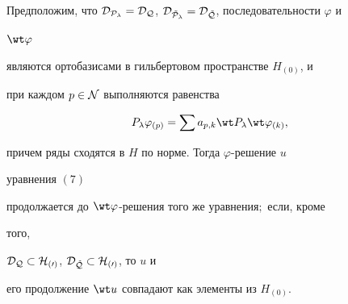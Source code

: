 \begin{thms} 


Предположим, что $\cal D_{P_\lambda}=\cal D_Q$, $\cal D_{\Tilde 


P_\lambda}=\cal D_{\Tilde Q}$, последовательности $\varphi$ и 


$\wt\varphi$ 


являются ортобазисами в гильбертовом пространстве $H_{(0)}$, и  


при каждом $p\in\cal N$ выполняются равенства 


\begin{equation} 


P_\lambda\varphi_{(p)}=\sum a_{p,k}\wt P_\lambda\wt\varphi_{(k)}, 


\end{equation} 


причем ряды сходятся в $H$ по норме. Тогда $\varphi$-решение $u$ 


уравнения $(7)$ 


продолжается до $\wt\varphi$-решения того же уравнения$;$ если, кроме 


того, 


$\cal D_Q\subset H_{(0)}$, $\cal D_{\Tilde Q}\subset H_{(0)}$, то $u$ и 


его продолжение $\wt u$ совпадают как элементы из $H_{(0)}$. 


\end{thms} 


 


